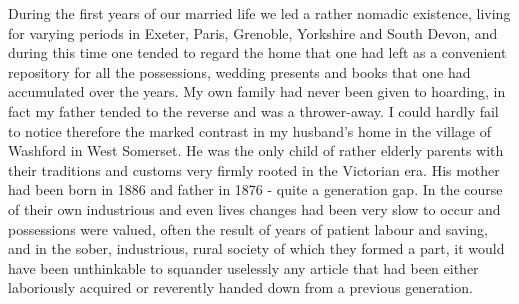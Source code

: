 
During the first years of our married life we led a rather nomadic existence, living for varying periods in Exeter, Paris, Grenoble, Yorkshire and South Devon, and during this time one tended to regard the home that one had left as a convenient repository for all the possessions, wedding presents and books that one had accumulated over the years. My own family had never been given to hoarding, in fact my father tended to the reverse and was a thrower-away. I could hardly fail to notice therefore the marked contrast in my husband’s home in the village of Washford in West Somerset. He was the only child of rather elderly parents with their traditions and customs very firmly rooted in the Victorian era. His mother had been born in 1886 and father in 1876 - quite a generation gap. In the course of their own industrious and even lives changes had been very slow to occur and possessions were valued, often the result of years of patient labour and saving, and in the sober, industrious, rural society of which they formed a part, it would have been unthinkable to squander uselessly any article that had been either laboriously acquired or reverently handed down from a previous generation.

